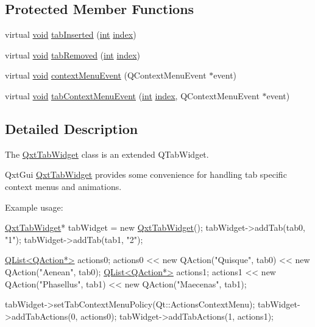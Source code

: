 \subsection*{Protected Member Functions}
\begin{DoxyCompactItemize}
\item 
virtual \hyperlink{group___u_a_v_objects_plugin_ga444cf2ff3f0ecbe028adce838d373f5c}{void} \hyperlink{class_qxt_tab_widget_acce406eb24064b4a78aec1df1efe1840}{tab\-Inserted} (\hyperlink{ioapi_8h_a787fa3cf048117ba7123753c1e74fcd6}{int} \hyperlink{glext_8h_ab47dd9958bcadea08866b42bf358e95e}{index})
\item 
virtual \hyperlink{group___u_a_v_objects_plugin_ga444cf2ff3f0ecbe028adce838d373f5c}{void} \hyperlink{class_qxt_tab_widget_a3f97a2b3706507ec0f0857619b6668d8}{tab\-Removed} (\hyperlink{ioapi_8h_a787fa3cf048117ba7123753c1e74fcd6}{int} \hyperlink{glext_8h_ab47dd9958bcadea08866b42bf358e95e}{index})
\item 
virtual \hyperlink{group___u_a_v_objects_plugin_ga444cf2ff3f0ecbe028adce838d373f5c}{void} \hyperlink{class_qxt_tab_widget_ad366c42f6bb793fe9e01531603aa45fb}{context\-Menu\-Event} (Q\-Context\-Menu\-Event $\ast$event)
\item 
virtual \hyperlink{group___u_a_v_objects_plugin_ga444cf2ff3f0ecbe028adce838d373f5c}{void} \hyperlink{class_qxt_tab_widget_addd8f604888b15c79a54c1b9b049c35c}{tab\-Context\-Menu\-Event} (\hyperlink{ioapi_8h_a787fa3cf048117ba7123753c1e74fcd6}{int} \hyperlink{glext_8h_ab47dd9958bcadea08866b42bf358e95e}{index}, Q\-Context\-Menu\-Event $\ast$event)
\end{DoxyCompactItemize}


\subsection{Detailed Description}
The \hyperlink{class_qxt_tab_widget}{Qxt\-Tab\-Widget} class is an extended Q\-Tab\-Widget. 

Qxt\-Gui \hyperlink{class_qxt_tab_widget}{Qxt\-Tab\-Widget} provides some convenience for handling tab specific context menus and animations.

Example usage\-: 
\begin{DoxyCode}
\hyperlink{class_qxt_tab_widget}{QxtTabWidget}* tabWidget = \textcolor{keyword}{new} \hyperlink{class_qxt_tab_widget}{QxtTabWidget}();
tabWidget->addTab(tab0, \textcolor{stringliteral}{"1"});
tabWidget->addTab(tab1, \textcolor{stringliteral}{"2"});

\hyperlink{class_q_list}{QList<QAction*>} actions0;
actions0 << \textcolor{keyword}{new} QAction(\textcolor{stringliteral}{"Quisque"}, tab0) << \textcolor{keyword}{new} QAction(\textcolor{stringliteral}{"Aenean"}, tab0);
\hyperlink{class_q_list}{QList<QAction*>} actions1;
actions1 << \textcolor{keyword}{new} QAction(\textcolor{stringliteral}{"Phasellus"}, tab1) << \textcolor{keyword}{new} QAction(\textcolor{stringliteral}{"Maecenas"}, tab1);

tabWidget->setTabContextMenuPolicy(Qt::ActionsContextMenu);
tabWidget->addTabActions(0, actions0);
tabWidget->addTabActions(1, actions1);
\end{DoxyCode}



